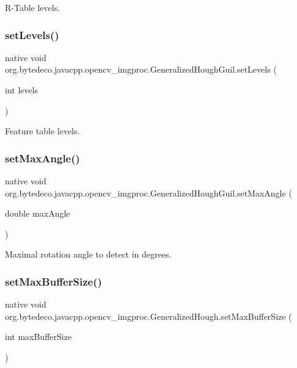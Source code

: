 R-\/\+Table levels. \mbox{\label{group__imgproc_ga9eccaeaa69ef94155a2945b8bb409ff4}} 
\subsubsection{\texorpdfstring{set\+Levels()}{setLevels()}\hspace{0.1cm}{\footnotesize\ttfamily [2/2]}}
{\footnotesize\ttfamily native void org.\+bytedeco.\+javacpp.\+opencv\+\_\+imgproc.\+Generalized\+Hough\+Guil.\+set\+Levels (\begin{DoxyParamCaption}\item[{int}]{levels }\end{DoxyParamCaption})}

Feature table levels. \mbox{\label{group__imgproc_gafe37f829f70bed0e3ebd23df71dea0f7}} 
\subsubsection{\texorpdfstring{set\+Max\+Angle()}{setMaxAngle()}}
{\footnotesize\ttfamily native void org.\+bytedeco.\+javacpp.\+opencv\+\_\+imgproc.\+Generalized\+Hough\+Guil.\+set\+Max\+Angle (\begin{DoxyParamCaption}\item[{double}]{max\+Angle }\end{DoxyParamCaption})}

Maximal rotation angle to detect in degrees. \mbox{\label{group__imgproc_gaad80aee63ad33db9cbf990de857c2794}} 
\subsubsection{\texorpdfstring{set\+Max\+Buffer\+Size()}{setMaxBufferSize()}}
{\footnotesize\ttfamily native void org.\+bytedeco.\+javacpp.\+opencv\+\_\+imgproc.\+Generalized\+Hough.\+set\+Max\+Buffer\+Size (\begin{DoxyParamCaption}\item[{int}]{max\+Buffer\+Size }\end{DoxyParamCaption})}

